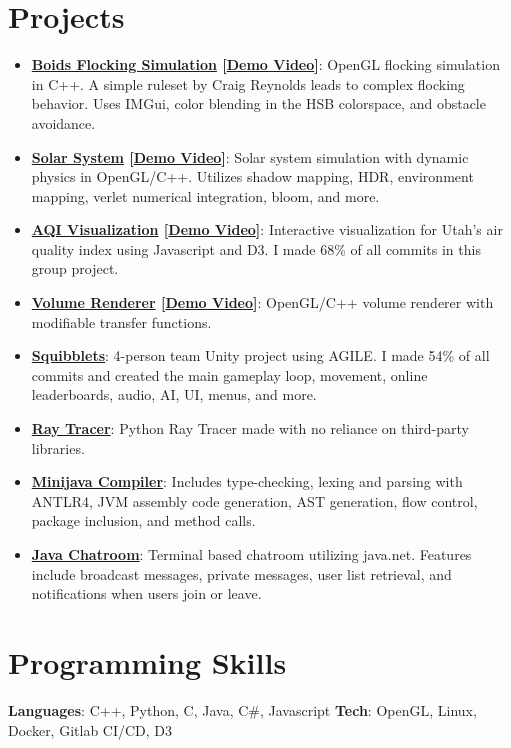 \documentclass[letterpaper,11pt]{article}
\newcommand{\resumeItem}[2]{
  \item\small{
    \textbf{#1}{: #2 \vspace{-2pt}}
  }
}
\newcommand{\resumeSubItem}[2]{\resumeItem{#1}{#2}\vspace{-4pt}}
\newcommand{\resumeSubHeadingListStart}{\begin{itemize}[leftmargin=*]}
\newcommand{\resumeSubHeadingListEnd}{\end{itemize}}
\begin{document}
\section{Projects}
  \resumeSubHeadingListStart
	\resumeSubItem{\href{https://github.com/Nathan-Hutton/boids}{Boids Flocking Simulation} [\href{https://www.youtube.com/watch?v=AMXlc43AJDk}{Demo Video}]}
	  {OpenGL flocking simulation in C++. A simple ruleset by Craig Reynolds leads to complex flocking behavior. Uses IMGui, color blending in the HSB colorspace, and obstacle avoidance.}
	\resumeSubItem{\href{https://github.com/Nathan-Hutton/solar-system}{Solar System} [\href{https://www.youtube.com/watch?v=KRmn0imU6Xk}{Demo Video}]}
      {Solar system simulation with dynamic physics in OpenGL/C++. Utilizes shadow mapping, HDR, environment mapping, verlet numerical integration, bloom, and more.}
	\resumeSubItem{\href{https://dataviscourse2024.github.io/group-project-air-quality-visual-1/}{AQI Visualization} [\href{https://www.youtube.com/watch?v=UqxseaUaWtI}{Demo Video}]}
      {Interactive visualization for Utah's air quality index using Javascript and D3. I made 68\% of all commits in this group project.}
	\resumeSubItem{\href{https://github.com/Nathan-Hutton/volume-rendering}{Volume Renderer} [\href{https://www.youtube.com/watch?v=h8PkjEuc3yY}{Demo Video}]}
	  {OpenGL/C++ volume renderer with modifiable transfer functions.}
    \resumeSubItem{\href{https://github.com/CharlesBirdgv/Squibblets}{Squibblets}}
      {4-person team Unity project using AGILE. I made 54\% of all commits and created the main gameplay loop, movement, online leaderboards, audio, AI, UI, menus, and more.}
    \resumeSubItem{\href{https://github.com/Nathan-Hutton/Ray-Tracer}{Ray Tracer}}
      {Python Ray Tracer made with no reliance on third-party libraries.}
    \resumeSubItem{\href{https://github.com/Nathan-Hutton/Minijava_Compiler_AST}{Minijava Compiler}}
      {Includes type-checking, lexing and parsing with ANTLR4, JVM assembly code generation, AST generation, flow control, package inclusion, and method calls.}
    \resumeSubItem{\href{https://github.com/Nathan-Hutton/Chatroom}{Java Chatroom}}
      {Terminal based chatroom utilizing java.net. Features include broadcast messages, private messages, user list retrieval, and notifications when users join or leave.}
  \resumeSubHeadingListEnd

%
\section{Programming Skills}
 \textbf{Languages}{: C++, Python, C, Java, C\#, Javascript}
 \hfill
 \textbf{Tech}{: OpenGL, Linux, Docker, Gitlab CI/CD, D3}

\end{document}
